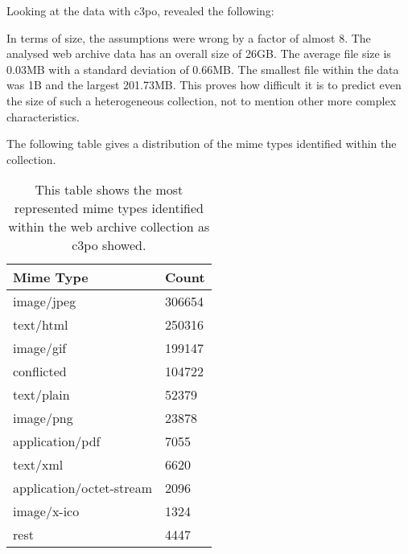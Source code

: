 Looking at the data with c3po, revealed the following:

In terms of size, the assumptions were wrong by a factor of almost 8. The analysed web archive data has an overall size of  26GB. The average file size is 0.03MB with a standard deviation of 0.66MB. The smallest file within the data was 1B and the largest 201.73MB. This proves how difficult it is to predict even the size of such a heterogeneous collection, not to mention other more complex characteristics.

The following table gives a distribution of the mime types identified within the collection.

\begin{table}[h]
\centering
\begin{tabular}{l || l }
\hline
Mime Type & Count \\
\hline
\hline
 image/jpeg & 306654 \\
 text/html 	& 250316 \\
 image/gif		&  199147 \\
 conflicted	&  104722 \\
 text/plain		& 52379 \\
 image/png & 23878 \\
 application/pdf & 7055 \\
 text/xml		& 6620\\
 application/octet-stream & 2096 \\
 image/x-ico	& 1324\\
 rest			& 4447\\
 \hline
\end{tabular}
\caption{This table shows the most represented mime types identified within the web archive collection as c3po showed.}
\label{tab:webarchive_mimetypes}
\end{table}

